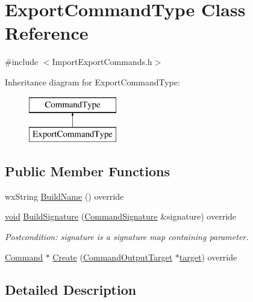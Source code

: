 \hypertarget{class_export_command_type}{}\section{Export\+Command\+Type Class Reference}
\label{class_export_command_type}


{\ttfamily \#include $<$Import\+Export\+Commands.\+h$>$}

Inheritance diagram for Export\+Command\+Type\+:\begin{figure}[H]
\begin{center}
\leavevmode
\includegraphics[height=2.000000cm]{class_export_command_type}
\end{center}
\end{figure}
\subsection*{Public Member Functions}
\begin{DoxyCompactItemize}
\item 
wx\+String \hyperlink{class_export_command_type_a8219dd9b93bec14ad756e413383bdec7}{Build\+Name} () override
\item 
\hyperlink{sound_8c_ae35f5844602719cf66324f4de2a658b3}{void} \hyperlink{class_export_command_type_ae823c33792fb29b10222ed987b83f995}{Build\+Signature} (\hyperlink{class_command_signature}{Command\+Signature} \&signature) override
\begin{DoxyCompactList}\small\item\em Postcondition\+: signature is a \textquotesingle{}signature\textquotesingle{} map containing parameter. \end{DoxyCompactList}\item 
\hyperlink{class_command}{Command} $\ast$ \hyperlink{class_export_command_type_a80f704861b64f3240743b9380e716299}{Create} (\hyperlink{class_command_output_target}{Command\+Output\+Target} $\ast$\hyperlink{lib_2expat_8h_a15a257516a87decb971420e718853137}{target}) override
\end{DoxyCompactItemize}


\subsection{Detailed Description}


